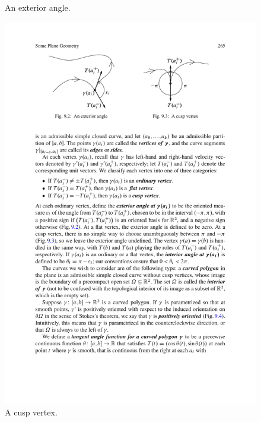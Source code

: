 \begin{figure}[htbp]
\begin{minipage}[b]{200pt}
\caption{An exterior angle.}
\end{minipage}
\hspace{20pt}
\begin{minipage}[b]{200pt}
\centering
\includegraphics{pictures/cusp-vertex}
\caption{A cusp vertex.}
\end{minipage}
\end{figure}

